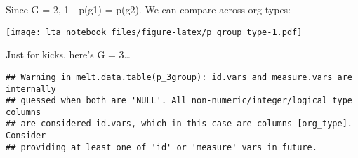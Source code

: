 \documentclass[
]{article}
\newenvironment{Shaded}{\begin{snugshade}}{\end{snugshade}}
\newcommand{\DataTypeTok}[1]{\textcolor[rgb]{0.13,0.29,0.53}{#1}}
\newcommand{\DecValTok}[1]{\textcolor[rgb]{0.00,0.00,0.81}{#1}}
\newcommand{\KeywordTok}[1]{\textcolor[rgb]{0.13,0.29,0.53}{\textbf{#1}}}
\newcommand{\NormalTok}[1]{#1}
\newcommand{\OperatorTok}[1]{\textcolor[rgb]{0.81,0.36,0.00}{\textbf{#1}}}
\newcommand{\StringTok}[1]{\textcolor[rgb]{0.31,0.60,0.02}{#1}}
\begin{document}
Since G = 2, 1 - p(g1) = p(g2). We can compare across org types:

\begin{Shaded}
\end{Shaded}

\texttt{[image: lta\_notebook\_files/figure-latex/p\_group\_type-1.pdf]}

Just for kicks, here's G = 3\ldots{}

\begin{Shaded}
\end{Shaded}

\begin{verbatim}
## Warning in melt.data.table(p_3group): id.vars and measure.vars are internally
## guessed when both are 'NULL'. All non-numeric/integer/logical type columns
## are considered id.vars, which in this case are columns [org_type]. Consider
## providing at least one of 'id' or 'measure' vars in future.
\end{verbatim}
\end{document}

